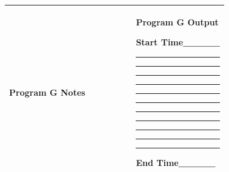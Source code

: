 \documentclass[]{article}
\begin{document}
\begin{longtable}[]{@{}ll@{}}
\toprule
\begin{minipage}[t]{0.47\columnwidth}\raggedright\strut
{Program G Notes ~~~~~~~~}
\strut\end{minipage} &
\begin{minipage}[t]{0.47\columnwidth}\raggedright\strut
{Program G Output}

{}

{}

{Start Time\_\_\_\_\_}

{}

\begin{center}\rule{0.5\linewidth}{\linethickness}\end{center}

{}

\begin{center}\rule{0.5\linewidth}{\linethickness}\end{center}

{}

\begin{center}\rule{0.5\linewidth}{\linethickness}\end{center}

{}

\begin{center}\rule{0.5\linewidth}{\linethickness}\end{center}

{}

\begin{center}\rule{0.5\linewidth}{\linethickness}\end{center}

{}

\begin{center}\rule{0.5\linewidth}{\linethickness}\end{center}

{}

\begin{center}\rule{0.5\linewidth}{\linethickness}\end{center}

{}

\begin{center}\rule{0.5\linewidth}{\linethickness}\end{center}

{}

\begin{center}\rule{0.5\linewidth}{\linethickness}\end{center}

{}

\begin{center}\rule{0.5\linewidth}{\linethickness}\end{center}

{}

\begin{center}\rule{0.5\linewidth}{\linethickness}\end{center}

{}

{}

{End Time\_\_\_\_\_}
\strut\end{minipage}\tabularnewline
\bottomrule
\end{longtable}
\end{document}
